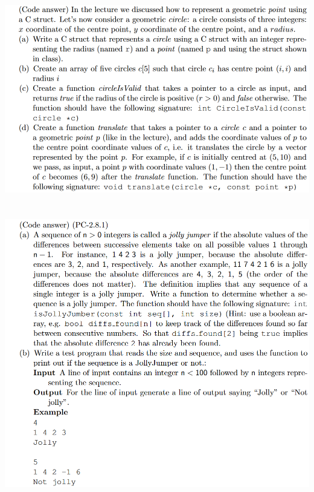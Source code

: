 \documentclass{article}
\begin{document}
\section{}
\includegraphics[width=\linewidth, keepaspectratio=true]{task6}
\vspace{2pt}\\



\section{}
\includegraphics[width=\linewidth, keepaspectratio=true]{task7}
\vspace{2pt}\\
\end{document}
